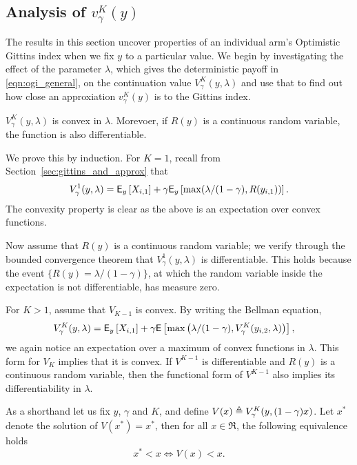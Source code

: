 \subsection{Analysis of $v^K_\gamma(y)$}
The results in this section uncover properties of an individual arm's Optimistic Gittins index when we fix $y$ to a particular value. We begin by investigating the effect of the parameter $\lambda$, which gives the deterministic payoff in \eqref{eqn:ogi_general}, on the continuation value $V^K_\gamma(y, \lambda)$ and use that to find out how close an approxiation $v^K_\gamma(y)$ is to the Gittins index.
\begin{fact}\label{fact:v_is_convex}
	$V^K_\gamma(y,\lambda)$ is convex in $\lambda$. Morevoer, if $R(y)$ is a continuous random variable, the function is also differentiable.
\end{fact}
\begin{myproof}[Proof.]
	We prove this by induction. For $K = 1$, recall from Section~\ref{sec:gittins_and_approx} that
	\begin{align*}
	V^1_\gamma(y, \lambda) = \mathsf{E}_y\left[X_{i,1} \right] +  \gamma \mathsf{E}_y\left[\max(\lambda/(1-\gamma), R(y_{i,1}))\right].
	\end{align*}
	The convexity property is clear as the above is an expectation over convex functions. 
	
	Now assume that $R(y)$ is a continuous random variable; we verify through the bounded convergence theorem that $V^1_\gamma(y, \lambda)$ is differentiable. This holds because the event $\{ R(y)= \lambda/(1-\gamma)\}$, at which the random variable inside the expectation is not differentiable, has measure zero.
	
	For $K > 1$, assume that $V_{K-1}$ is convex. By writing the Bellman equation,
	\begin{align*}
	V^K_\gamma(y, \lambda) & = \mathsf{E}_y\left[X_{i,1}\right] + \gamma \mathsf{E}\left[\max\left(\lambda/(1-\gamma), V^K_\gamma(y_{i,2}, \lambda)\right) \right],
	\end{align*}
	we again notice an expectation over a maximum of convex functions in $\lambda$. This form for $V_K$ implies that it is convex. If $V^{K-1}$ is differentiable and $R(y)$ is a continuous random variable, then the functional form of $V^{K-1}$ also implies its differentiability in $\lambda$.
\end{myproof}
\begin{lemma} \label{eq:important_fact}
	As a shorthand let us fix $y$, $\gamma$ and $K$, and define $V(x) \triangleq V_\gamma^K(y, (1-\gamma)x)$. Let $x^*$ denote the solution of $V(x^*) = x^*$, then for all $x \in \Re$, the following equivalence holds
	\begin{equation} \label{eq:equivlance_lambda1}
	x^* < x  \Longleftrightarrow V(x) < x.
	\end{equation}
\end{lemma}

